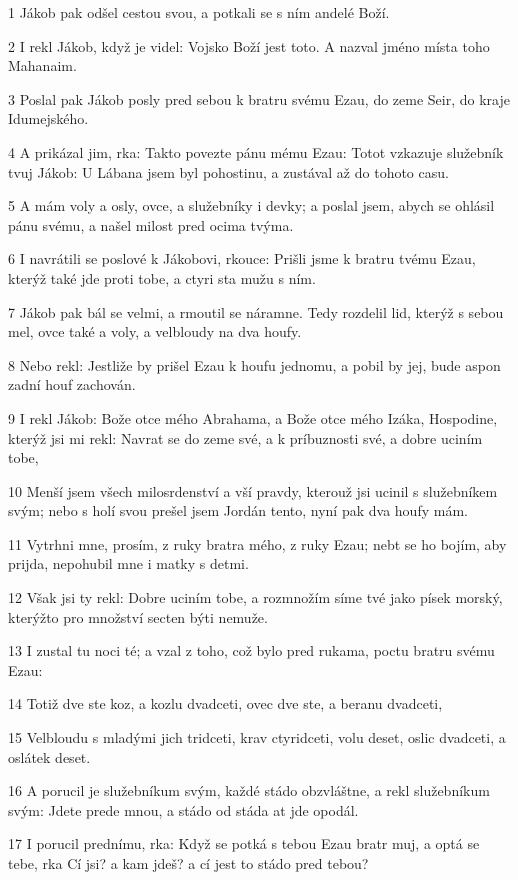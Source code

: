 \par 1 Jákob pak odšel cestou svou, a potkali se s ním andelé Boží.
\par 2 I rekl Jákob, když je videl: Vojsko Boží jest toto. A nazval jméno místa toho Mahanaim.
\par 3 Poslal pak Jákob posly pred sebou k bratru svému Ezau, do zeme Seir, do kraje Idumejského.
\par 4 A prikázal jim, rka: Takto povezte pánu mému Ezau: Totot vzkazuje služebník tvuj Jákob: U Lábana jsem byl pohostinu, a zustával až do tohoto casu.
\par 5 A mám voly a osly, ovce, a služebníky i devky; a poslal jsem, abych se ohlásil pánu svému, a našel milost pred ocima tvýma.
\par 6 I navrátili se poslové k Jákobovi, rkouce: Prišli jsme k bratru tvému Ezau, kterýž také jde proti tobe, a ctyri sta mužu s ním.
\par 7 Jákob pak bál se velmi, a rmoutil se náramne. Tedy rozdelil lid, kterýž s sebou mel, ovce také a voly, a velbloudy na dva houfy.
\par 8 Nebo rekl: Jestliže by prišel Ezau k houfu jednomu, a pobil by jej, bude aspon zadní houf zachován.
\par 9 I rekl Jákob: Bože otce mého Abrahama, a Bože otce mého Izáka, Hospodine, kterýž jsi mi rekl: Navrat se do zeme své, a k príbuznosti své, a dobre uciním tobe,
\par 10 Menší jsem všech milosrdenství a vší pravdy, kterouž jsi ucinil s služebníkem svým; nebo s holí svou prešel jsem Jordán tento, nyní pak dva houfy mám.
\par 11 Vytrhni mne, prosím, z ruky bratra mého, z ruky Ezau; nebt se ho bojím, aby prijda, nepohubil mne i matky s detmi.
\par 12 Však jsi ty rekl: Dobre uciním tobe, a rozmnožím síme tvé jako písek morský, kterýžto pro množství secten býti nemuže.
\par 13 I zustal tu noci té; a vzal z toho, což bylo pred rukama, poctu bratru svému Ezau:
\par 14 Totiž dve ste koz, a kozlu dvadceti, ovec dve ste, a beranu dvadceti,
\par 15 Velbloudu s mladými jich tridceti, krav ctyridceti, volu deset, oslic dvadceti, a oslátek deset.
\par 16 A porucil je služebníkum svým, každé stádo obzvláštne, a rekl služebníkum svým: Jdete prede mnou, a stádo od stáda at jde opodál.
\par 17 I porucil prednímu, rka: Když se potká s tebou Ezau bratr muj, a optá se tebe, rka Cí jsi? a kam jdeš? a cí jest to stádo pred tebou?
